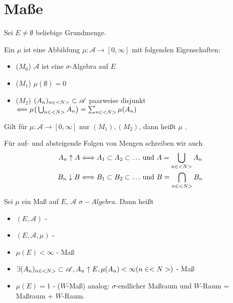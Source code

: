 \section{Maße}

Sei $E \neq \emptyset$ beliebige Grundmenge.

\begin{definition}[Maß]
	Ein  $\mu$ ist eine Abbildung $\mu: \mathscr{A} \to [0,\infty]$ mit folgenden Eigenschaften:
	\begin{itemize}
		\item ($M_0$) $\mathscr{A}$ ist eine $\sigma$-Algebra auf $E$
		\item ($M_1$) $\mu(\emptyset) = 0$
		\item ($M_2$) $(A_n)_{n \in <N>} \subset \mathscr{A}$ paarweise disjunkt $\Longleftarrow \mu\big(\bigcup_{n\in <N>} A_n\big) = \sum_{n\in <N>} \mu(A_n)$
	\end{itemize}
	Gilt für $\mu: \mathscr{A} \to [0,\infty]$ nur $(M_1),(M_2)$, dann heißt $\mu$ .
\end{definition}

Für auf- und absteigende Folgen von Mengen schreiben wir auch
\begin{align}
	A_n \uparrow A \Longleftrightarrow A_1 \subset A_2 \subset \dots &\text{ und } A = \bigcup_{n\in <N>} A_n \notag \\
	B_n \downarrow B \Longleftrightarrow B_1 \subset B_2 \subset \dots &\text{ und } B = \bigcap_{n\in <N>} B_n \notag
\end{align}

\begin{definition}
	Sei $\mu$ ein Maß auf $E$, $\mathscr{A}$ $\sigma-Algebra$. Dann heißt
	\begin{itemize}
		\item $(E,\mathscr{A})$ - 
		\item $(E,\mathscr{A},\mu)$ - 
		\item $\mu(E) < \infty$ -  Maß
		\item $\exists (A_n)_{n \in <N>} \subset \mathscr{A}, A_n \uparrow E, \mu(A_n) < \infty (n \in <N>)$ -  Maß
		\item $\mu(E) = 1$ -  ($W$-Maß)
		analog: $\sigma$-endlicher Maßraum und $W$-Raum = Maßraum + $W$-Raum.
	\end{itemize}
\end{definition}

